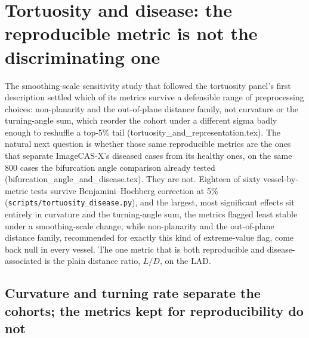 
\section*{Tortuosity and disease: the reproducible metric is not the discriminating one}

The smoothing-scale sensitivity study that followed the tortuosity panel's first description
settled which of its metrics survive a defensible range of preprocessing choices: non-planarity
and the out-of-plane distance family, not curvature or the turning-angle sum, which reorder the
cohort under a different sigma badly enough to reshuffle a top-5\% tail
(tortuosity\_and\_representation.tex). The natural next question is whether those same reproducible
metrics are the ones that separate ImageCAS-X's diseased cases from its healthy ones, on the same
800 cases the bifurcation angle comparison already tested (bifurcation\_angle\_and\_disease.tex).
They are not. Eighteen of sixty vessel-by-metric tests survive Benjamini--Hochberg correction at
5\% (\texttt{scripts/tortuosity\_disease.py}), and the largest, most significant effects sit
entirely in curvature and the turning-angle sum, the metrics flagged least stable under a
smoothing-scale change, while non-planarity and the out-of-plane distance family, recommended for
exactly this kind of extreme-value flag, come back null in every vessel. The one metric that is
both reproducible and disease-associated is the plain distance ratio, $L/D$, on the LAD.

\subsection*{Curvature and turning rate separate the cohorts; the metrics kept for reproducibility do not}

